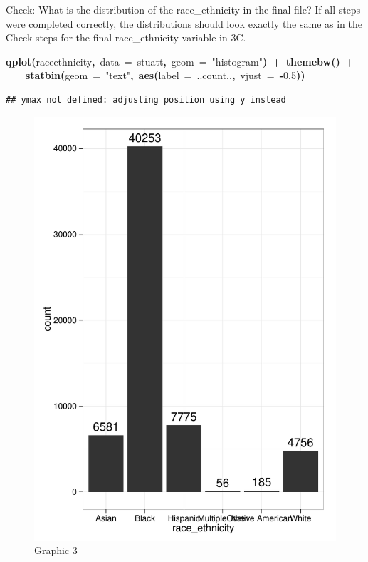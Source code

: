 \documentclass[12pt]{article}
\makeatletter
\newcommand{\hlnumber}[1]{\textcolor[rgb]{0,0,0}{#1}}%
\newcommand{\hlfunctioncall}[1]{\textcolor[rgb]{0.501960784313725,0,0.329411764705882}{\textbf{#1}}}%
\newcommand{\hlstring}[1]{\textcolor[rgb]{0.6,0.6,1}{#1}}%
\newcommand{\hlkeyword}[1]{\textcolor[rgb]{0,0,0}{\textbf{#1}}}%
\newcommand{\hlargument}[1]{\textcolor[rgb]{0.690196078431373,0.250980392156863,0.0196078431372549}{#1}}%
\newcommand{\hlsymbol}[1]{\textcolor[rgb]{0,0,0}{#1}}%
\newcommand{\hlstd}[1]{\textcolor[rgb]{0,0,0}{#1}}%
\newenvironment{kframe}{%
 \def\FrameCommand##1{\hskip\@totalleftmargin \hskip-\fboxsep
 \colorbox{shadecolor}{##1}\hskip-\fboxsep
     \hskip-\linewidth \hskip-\@totalleftmargin \hskip\columnwidth}%
 \MakeFramed {\advance\hsize-\width
   \@totalleftmargin\z@ \linewidth\hsize
   \@setminipage}}%
 {\par\unskip\endMakeFramed}
\newenvironment{knitrout}{}{} %
\makeatother
\begin{document}
Check: What is the distribution of the race\_ethnicity in the final file? If all steps were completed correctly, the distributions 
should look exactly the same as in the Check steps for the final  race\_ethnicity variable in 3C.

\begin{knitrout}
\color{fgcolor}\begin{kframe}
\begin{flushleft}
\ttfamily\noindent
\hlfunctioncall{qplot}\hlkeyword{(}\hlsymbol{race\usebox{\hlnormalsizeboxunderscore}ethnicity}\hlkeyword{,}{\ }\hlargument{data}{\ }\hlargument{=}{\ }\hlsymbol{stuatt}\hlkeyword{,}{\ }\hlargument{geom}{\ }\hlargument{=}{\ }\hlstring{"{}histogram"{}}\hlkeyword{)}{\ }\hlkeyword{+}{\ }\hlfunctioncall{theme\usebox{\hlnormalsizeboxunderscore}bw}\hlkeyword{(}\hlkeyword{)}{\ }\hlkeyword{+}\hspace*{\fill}\\
\hlstd{}{\ }{\ }{\ }{\ }\hlfunctioncall{stat\usebox{\hlnormalsizeboxunderscore}bin}\hlkeyword{(}\hlargument{geom}{\ }\hlargument{=}{\ }\hlstring{"{}text"{}}\hlkeyword{,}{\ }\hlfunctioncall{aes}\hlkeyword{(}\hlargument{label}{\ }\hlargument{=}{\ }\hlsymbol{..count..}\hlkeyword{,}{\ }\hlargument{vjust}{\ }\hlargument{=}{\ }\hlkeyword{-}\hlnumber{0.5}\hlkeyword{)}\hlkeyword{)}\mbox{}
\normalfont
\end{flushleft}
\begin{verbatim}
## ymax not defined: adjusting position using y instead
\end{verbatim}
\end{kframe}\begin{figure}[]


\includegraphics[width=.7\textwidth,height=.4\paperheight]{figure/histogramfinal} \hfill{}

\caption[Graphic 3]{Graphic 3\label{fig:histogramfinal}}
\end{figure}

\end{knitrout}
\end{document}
